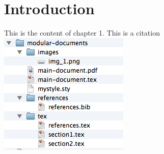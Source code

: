 \section{Introduction}

This is the content of chapter 1. This is a citation \cite{domingos1997optimality}\\

\includegraphics{./images/img_1.png}